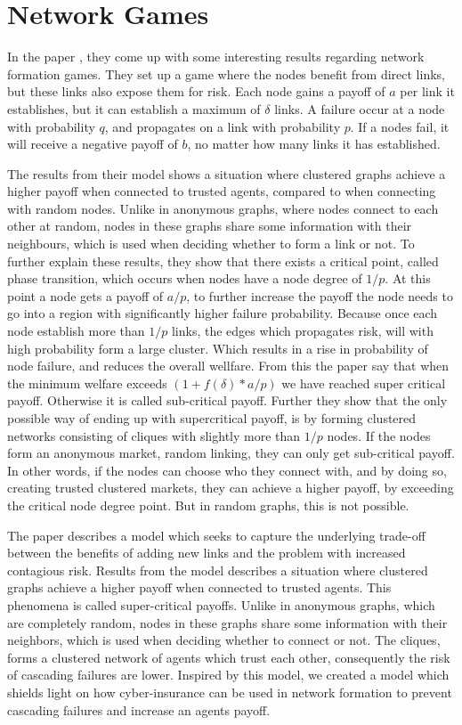\chapter{Network Games}
\label{chp:networkgames} 

In the paper \cite{contagion}, they come up with some interesting results regarding network formation games. 
They set up a game where the nodes benefit from direct links, but these links also expose them for risk. 
Each node gains a payoff of  $a$ per link it establishes, but it can establish a maximum of $\delta$ links.
A failure occur at a node with probability $q$, and propagates on a link with probability $p$. If a nodes fail, it will receive a negative payoff of $b$, no matter how many links it has established.

The results from their model shows a situation where clustered graphs achieve a higher payoff when connected to trusted agents, compared to when connecting with random nodes. Unlike in anonymous graphs, where nodes connect to each other at random, nodes in these graphs share some information with their neighbours, which is used when deciding whether to form a link or not. 
To further explain these results, they show that there exists a critical point, called phase transition, which occurs when nodes have a node degree of $1/p$. 
At this point a node gets a payoff of $a/p$, to further increase the payoff the node needs to go into a region with significantly higher failure probability. 
Because once each node establish more than $1/p$ links, the edges which propagates risk, will with high probability form a large cluster. Which results in a rise in probability of node failure, and reduces the overall wellfare.
From this the paper say that when the minimum welfare exceeds 
$(1+f(\delta)*a/p)
$
we have reached super critical payoff. Otherwise it is called sub-critical payoff. 
Further they show that the only possible way of ending up with supercritical payoff, is by forming clustered networks consisting of cliques with slightly more than $1/p$ nodes. 
If the nodes form an anonymous market, random linking, they can only get sub-critical payoff. 
In other words, if the nodes can choose who they connect with, and by doing so, creating trusted clustered markets, they can achieve a higher payoff, by exceeding the critical node degree point. But in random graphs, this is not possible.  

The paper \cite{contagion} describes a model which seeks to capture the underlying trade-off between the benefits of adding new links and the problem with increased contagious risk. Results from the model describes a situation where clustered graphs achieve a higher payoff when connected to trusted agents. This phenomena is called super-critical payoffs. Unlike in anonymous graphs, which are completely random, nodes in these graphs share some information with their neighbors, which is used when deciding whether to connect or not. The cliques, forms a clustered network of agents which trust each other, consequently the risk of cascading failures are lower.
Inspired by this model, we created a model which shields light on how cyber-insurance can be used in network formation to prevent cascading failures and increase an agents payoff.  

